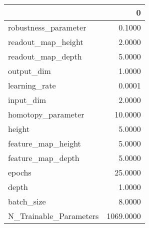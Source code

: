 \begin{tabular}{lr}
\toprule
{} &          0 \\
\midrule
robustness\_parameter   &     0.1000 \\
readout\_map\_height     &     2.0000 \\
readout\_map\_depth      &     5.0000 \\
output\_dim             &     1.0000 \\
learning\_rate          &     0.0001 \\
input\_dim              &     2.0000 \\
homotopy\_parameter     &    10.0000 \\
height                 &     5.0000 \\
feature\_map\_height     &     5.0000 \\
feature\_map\_depth      &     5.0000 \\
epochs                 &    25.0000 \\
depth                  &     1.0000 \\
batch\_size             &     8.0000 \\
N\_Trainable\_Parameters &  1069.0000 \\
\bottomrule
\end{tabular}
